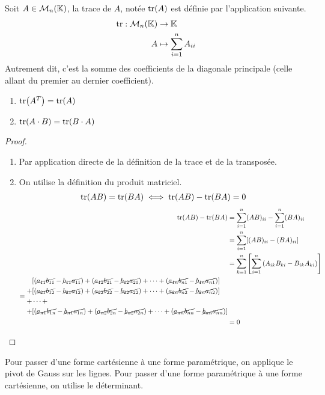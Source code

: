 \begin{definition}
	Soit $A \in \mathcal{M}_n(\mathbb{K})$, la trace de $A$, notée $\tr(A)$ est définie par l'application suivante.
	\begin{align*}
		\tr : \mathcal{M}_n(\mathbb{K}) &\to \mathbb{K} \\
		A &\mapsto \sum_{i = 1}^{n} A_{ii}
	\end{align*}
    Autrement dit, c'est la somme des coefficients de la diagonale principale (celle allant du premier au dernier coefficient).
\end{definition}

\begin{lemma}
	\begin{multicols}{2}
	    \begin{enumerate}
    		\item $\tr(A^T) = \tr(A)$
    		\item $\tr(A \cdot B) = \tr(B \cdot A)$
    	\end{enumerate}
	\end{multicols}
\end{lemma}

\begin{proof}\leavevmode
    \begin{enumerate}
        \item Par application directe de la définition de la trace et de la transposée.
        \item On utilise la définition du produit matriciel.
        \begin{align*}
            \tr(AB) = \tr(BA) \iff \tr(AB) - \tr(BA) = 0
        \end{align*}
        \begin{align*}
            \tr(AB) - \tr(BA) &=\sum_{i=1}^n (AB)_{ii} - \sum_{i=1}^n (BA)_{ii} \\ 
            &= \sum_{i=1}^n [(AB)_{ii} - (BA)_{ii}] \\ 
            &= \sum_{k=1}^n \left[ \sum_{i=1}^n \left( A_{ik} B_{ki} - B_{ik}A_{ki} \right) \right] \\ 
            = 
            \begin{split}
                &[(\cancel{a_{11} b_{11}} - \cancel{b_{11} a_{11}}) +  (\cancel{a_{12} b_{21}} - \cancel{b_{12} a_{21}}) + \cdots + (\cancel{a_{1n} b_{n1}} - \cancel{b_{1n} a_{n1}})] \\
                + &[(\cancel{a_{21} b_{12}} - \cancel{b_{21}a_{12}}) + (\cancel{a_{22} b_{22}} - \cancel{b_{22} a_{22}}) + \cdots + (\cancel{a_{2n}b_{n2}} - \cancel{b_{2n}a_{n2}})] \\
                + &\cdots + \\ 
                + &[(\cancel{a_{n1} b_{1n}} - \cancel{b_{n1} a_{1n}}) + (\cancel{a_{n2} b_{2n}} - \cancel{b_{n2} a_{2n}}) + \cdots + (\cancel{a_{nn} b_{nn}} - \cancel{b_{nn} a_{nn}})]
            \end{split}
            \\
            &= 0
        \end{align*}
    \end{enumerate}
\end{proof}

\begin{proposition}
    Pour passer d'une forme cartésienne à une forme paramétrique, on applique le pivot de Gauss sur les lignes.
    Pour passer d'une forme paramétrique à une forme cartésienne, on utilise le déterminant.
\end{proposition}
